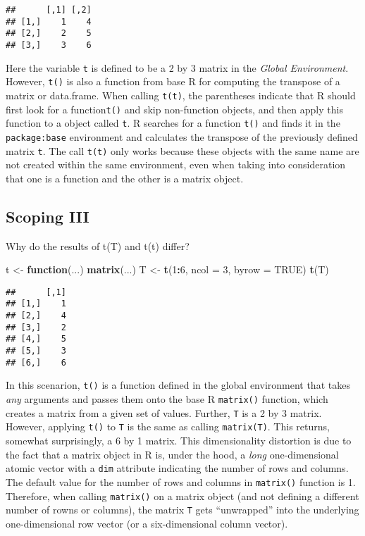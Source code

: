 \documentclass[12,]{article}
\newenvironment{Shaded}{\begin{snugshade}}{\end{snugshade}}
\newcommand{\KeywordTok}[1]{\textcolor[rgb]{0.13,0.29,0.53}{\textbf{#1}}}
\newcommand{\DataTypeTok}[1]{\textcolor[rgb]{0.13,0.29,0.53}{#1}}
\newcommand{\DecValTok}[1]{\textcolor[rgb]{0.00,0.00,0.81}{#1}}
\newcommand{\StringTok}[1]{\textcolor[rgb]{0.31,0.60,0.02}{#1}}
\newcommand{\OtherTok}[1]{\textcolor[rgb]{0.56,0.35,0.01}{#1}}
\newcommand{\ControlFlowTok}[1]{\textcolor[rgb]{0.13,0.29,0.53}{\textbf{#1}}}
\newcommand{\OperatorTok}[1]{\textcolor[rgb]{0.81,0.36,0.00}{\textbf{#1}}}
\newcommand{\NormalTok}[1]{#1}
\begin{document}
\begin{verbatim}
##      [,1] [,2]
## [1,]    1    4
## [2,]    2    5
## [3,]    3    6
\end{verbatim}

Here the variable \texttt{t} is defined to be a 2 by 3 matrix in the
\emph{Global Environment}. However, \texttt{t()} is also a function from
base R for computing the transpose of a matrix or data.frame. When
calling \texttt{t(t)}, the parentheses indicate that R should first look
for a function\texttt{t()} and skip non-function objects, and then apply
this function to a object called \texttt{t}. R searches for a function
\texttt{t()} and finds it in the \texttt{package:base} environment and
calculates the transpose of the previously defined matrix \texttt{t}.
The call \texttt{t(t)} only works because these objects with the same
name are not created within the same environment, even when taking into
consideration that one is a function and the other is a matrix object.

\subsection*{Scoping III}\label{scoping-iii}

Why do the results of t(T) and t(t) differ?

\begin{Shaded}
\begin{Highlighting}[]
\NormalTok{t <-}\StringTok{ }\ControlFlowTok{function}\NormalTok{(...) }\KeywordTok{matrix}\NormalTok{(...)}
\NormalTok{T <-}\StringTok{ }\KeywordTok{t}\NormalTok{(}\DecValTok{1}\OperatorTok{:}\DecValTok{6}\NormalTok{, }\DataTypeTok{ncol =} \DecValTok{3}\NormalTok{, }\DataTypeTok{byrow =} \OtherTok{TRUE}\NormalTok{)}
\KeywordTok{t}\NormalTok{(T)}
\end{Highlighting}
\end{Shaded}

\begin{verbatim}
##      [,1]
## [1,]    1
## [2,]    4
## [3,]    2
## [4,]    5
## [5,]    3
## [6,]    6
\end{verbatim}

In this scenarion, \texttt{t()} is a function defined in the global
environment that takes \emph{any} arguments and passes them onto the
base R \texttt{matrix()} function, which creates a matrix from a given
set of values. Further, \texttt{T} is a 2 by 3 matrix. However, applying
\texttt{t()} to \texttt{T} is the same as calling \texttt{matrix(T)}.
This returns, somewhat surprisingly, a 6 by 1 matrix. This
dimensionality distortion is due to the fact that a matrix object in R
is, under the hood, a \emph{long} one-dimensional atomic vector with a
\texttt{dim} attribute indicating the number of rows and columns. The
default value for the number of rows and columns in \texttt{matrix()}
function is 1. Therefore, when calling \texttt{matrix()} on a matrix
object (and not defining a different number of rowns or columns), the
matrix \texttt{T} gets ``unwrapped'' into the underlying one-dimensional
row vector (or a six-dimensional column vector).
\end{document}
